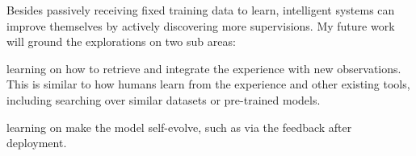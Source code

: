 Besides passively receiving fixed training data to learn, intelligent
systems can improve themselves by actively discovering more
supervisions. My future work will ground the explorations on two sub
areas:
\begin{inparaenum}[(a)]
\item learning on how to retrieve and integrate the experience with
  new observations. This is similar to how humans learn from the
  experience and other existing tools, including searching over
  similar datasets or pre-trained models.
\item learning on make the model self-evolve, such as via the
  feedback after deployment.
\end{inparaenum}


